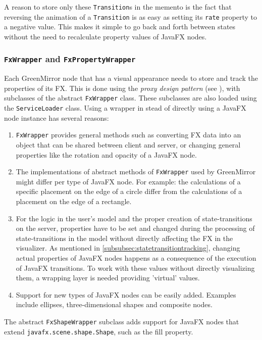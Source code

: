 \documentclass[a4paper]{article}
\begin{document}
A reason to store only these \lstinline{Transition}s in the memento is the fact that reversing the animation of a \lstinline{Transition} is as easy as setting its \lstinline{rate} property to a negative value. This makes it simple to go back and forth between states without the need to recalculate property values of JavaFX nodes.


\subsubsection{\lstinline{FxWrapper} and \lstinline{FxPropertyWrapper}}\label{subsubsec:fxwrapper}
Each GreenMirror node that has a visual appearance needs to store and track the properties of its FX. This is done using the \emph{proxy design pattern} (see \cite{kuchana2004,sourcemaking}), with subclasses of the abstract \lstinline{FxWrapper} class. These subclasses are also loaded using the \lstinline{ServiceLoader} class. Using a wrapper in stead of directly using a JavaFX node instance has several reasons:
\begin{enumerate}
\item \lstinline{FxWrapper} provides general methods such as converting FX data into an object that can be shared between client and server, or changing general properties like the rotation and opacity of a JavaFX node.
\item The implementations of abstract methods of \lstinline{FxWrapper} used by GreenMirror might differ per type of JavaFX node. For example: the calculations of a specific placement on the edge of a circle differ from the calculations of a placement on the edge of a rectangle.
\item For the logic in the user's model and the proper creation of state-transitions on the server, properties have to be set and changed during the processing of state-transitions in the model without directly affecting the FX in the visualizer. As mentioned in \cref{subsubsec:statetransitiontracking}, changing actual properties of JavaFX nodes happens as a consequence of the execution of JavaFX transitions. To work with these values without directly visualizing them, a wrapping layer is needed providing 'virtual' values. 
\item Support for new types of JavaFX nodes can be easily added. Examples include ellipses, three-dimensional shapes and composite nodes.
\end{enumerate}
The abstract \lstinline{FxShapeWrapper} subclass adds support for JavaFX nodes that extend \lstinline{javafx.scene.shape.Shape}, such as the fill property.
\end{document}
